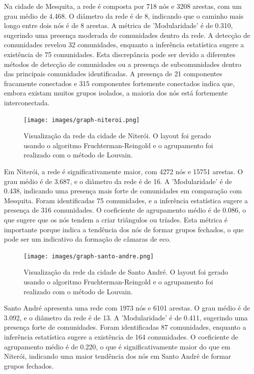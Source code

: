 Na cidade de Mesquita, a rede é composta por 718 nós e 3208 arestas, com um grau médio de 4.468. O diâmetro da rede é de 8, indicando que o caminho mais longo entre dois nós é de 8 arestas. A métrica de 'Modularidade' é de 0.310, sugerindo uma presença moderada de comunidades dentro da rede. A detecção de comunidades revelou 32 comunidades, enquanto a inferência estatística sugere a existência de 75 comunidades. Esta discrepância pode ser devido a diferentes métodos de detecção de comunidades ou a presença de subcomunidades dentro das principais comunidades identificadas. A presença de 21 componentes fracamente conectados e 315 componentes fortemente conectados indica que, embora existam muitos grupos isolados, a maioria dos nós está fortemente interconectada.

\begin{figure}[h]
    \centering
    \texttt{[image: images/graph-niteroi.png]}
    \caption{Visualização da rede da cidade de Niterói. O layout foi gerado usando o algoritmo Fruchterman-Reingold e o agrupamento foi realizado com o método de Louvain.}
    \label{fig:niteroi-graph}
	\fautor
\end{figure}

Em Niterói, a rede é significativamente maior, com 4272 nós e 15751 arestas. O grau médio é de 3.687, e o diâmetro da rede é de 16. A 'Modularidade' é de 0.438, indicando uma presença mais forte de comunidades em comparação com Mesquita. Foram identificadas 75 comunidades, e a inferência estatística sugere a presença de 316 comunidades. O coeficiente de agrupamento médio é de 0.086, o que sugere que os nós tendem a criar triângulos ou tríades. Esta métrica é importante porque indica a tendência dos nós de formar grupos fechados, o que pode ser um indicativo da formação de câmaras de eco.

\begin{figure}[h]
    \centering
    \texttt{[image: images/graph-santo-andre.png]}
    \caption{Visualização da rede da cidade de Santo André. O layout foi gerado usando o algoritmo Fruchterman-Reingold e o agrupamento foi realizado com o método de Louvain.}
    \label{fig:santo-andre-graph}
	\fautor
\end{figure}

Santo André apresenta uma rede com 1973 nós e 6101 arestas. O grau médio é de 3.092, e o diâmetro da rede é de 13. A 'Modularidade' é de 0.411, sugerindo uma presença forte de comunidades. Foram identificadas 87 comunidades, enquanto a inferência estatística sugere a existência de 164 comunidades. O coeficiente de agrupamento médio é de 0.220, o que é significativamente maior do que em Niterói, indicando uma maior tendência dos nós em Santo André de formar grupos fechados.

